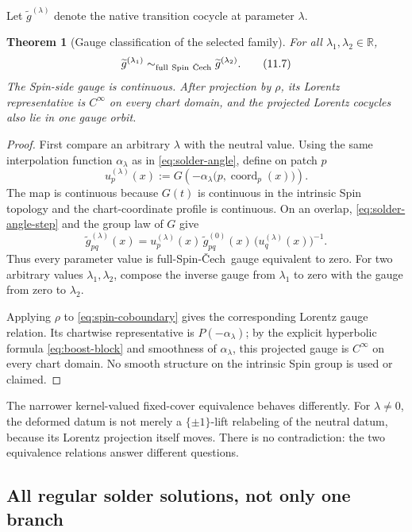 \documentclass[11pt,a4paper]{article}
\newtheorem{theorem}{Theorem}[section]
\theoremstyle{definition}
\theoremstyle{remark}
\newcommand{\R}{\mathbb{R}}
\newcommand{\Cech}{\ifmmode\text{\v{C}ech}\else\v{C}ech\fi}
\begin{document}
Let \(\widetilde g^{(\lambda)}\) denote the native transition cocycle at
parameter \(\lambda\).

\begin{theorem}[Gauge classification of the selected family]
\label{thm:gauge-orbit}
For all \(\lambda_{1},\lambda_{2}\in\R\),
\[
   \widetilde g^{(\lambda_{1})}
   \sim_{\mathrm{full\ Spin\ \Cech}}
   \widetilde g^{(\lambda_{2})}.
\tag{11.7}
\]
The Spin-side gauge is continuous.  After projection by \(\rho\), its
Lorentz representative is \(C^\infty\) on every chart domain, and the
projected Lorentz cocycles also lie in one gauge orbit.
\end{theorem}

\begin{proof}
First compare an arbitrary \(\lambda\) with the neutral value.  Using the
same interpolation function \(\alpha_\lambda\) as in
\eqref{eq:solder-angle}, define on patch \(p\)
\[
   u_p^{(\lambda)}(x)
   :=G\!\left(-\alpha_\lambda
       \bigl(p,\operatorname{coord}_p(x)\bigr)\right).
\tag{11.7a}\label{eq:spin-gauge}
\]
The map is continuous because \(G(t)\) is continuous in the intrinsic Spin
topology and the chart-coordinate profile is continuous.  On an overlap,
\eqref{eq:solder-angle-step} and the group law of \(G\) give
\[
   \widetilde g_{pq}^{(\lambda)}(x)
   =u_p^{(\lambda)}(x)\,
      \widetilde g_{pq}^{(0)}(x)\,
      \bigl(u_q^{(\lambda)}(x)\bigr)^{-1}.
\tag{11.7b}\label{eq:spin-coboundary}
\]
Thus every parameter value is full-Spin-\Cech\ gauge equivalent to zero.
For two arbitrary values \(\lambda_1,\lambda_2\), compose the inverse gauge
from \(\lambda_1\) to zero with the gauge from zero to \(\lambda_2\).

Applying \(\rho\) to \eqref{eq:spin-coboundary} gives the corresponding
Lorentz gauge relation.  Its chartwise representative is
\(P(-\alpha_\lambda)\); by the explicit hyperbolic formula
\eqref{eq:boost-block} and smoothness of \(\alpha_\lambda\), this projected
gauge is \(C^\infty\) on every chart domain.  No smooth structure on the
intrinsic Spin group is used or claimed.
\end{proof}

The narrower kernel-valued fixed-cover equivalence behaves differently.
For \(\lambda\neq0\), the deformed datum is not merely a \(\{\pm1\}\)-lift
relabeling of the neutral datum, because its Lorentz projection itself
moves.  There is no contradiction: the two equivalence relations answer
different questions.

\subsection{All regular solder solutions, not only one branch}
\end{document}

